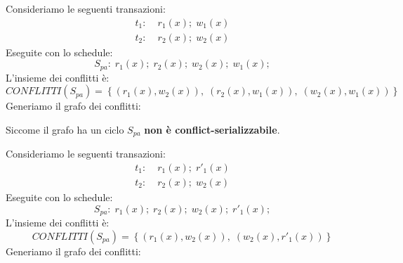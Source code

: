 \documentclass[a4paper]{article}
\begin{document}
\vspace{1em}
\noindent
\begin{example}
  Consideriamo le seguenti transazioni:
  \[
    \begin{aligned}
      t_1:\; & r_1(x); \; w_1(x) \\
      t_2:\; & r_2(x); \; w_2(x)
    \end{aligned}
  \] 
  Eseguite con lo schedule:
  \[
    S_{pa}:\; r_1(x); \; r_2(x); \; w_2(x); \; w_1(x);
  \] 
  L'insieme dei conflitti è:
  \[
    CONFLITTI(S_{pa}) = \left\{ (r_1(x), w_2(x)),\; (r_2(x), w_1(x)),\; (w_2(x), w_1(x)) \right\}
  \] 
  Generiamo il grafo dei conflitti:
  \begin{figure}[H]
    \centering
  \end{figure}
  \noindent
  Siccome il grafo ha un ciclo \( S_{pa} \) \textbf{non è conflict-serializzabile}.
\end{example}

\begin{example}
  Consideriamo le seguenti transazioni:
  \[
    \begin{aligned}
      t_1:\; & r_1(x); \; r'_1(x) \\
      t_2:\; & r_2(x); \; w_2(x)
    \end{aligned}
  \] 
  Eseguite con lo schedule:
  \[
    S_{pa}:\; r_1(x); \; r_2(x); \; w_2(x); \; r'_1(x);
  \] 
  L'insieme dei conflitti è:
  \[
    CONFLITTI(S_{pa}) = \left\{ (r_1(x), w_2(x)),\; (w_2(x), r'_1(x)) \right\}
  \] 
  Generiamo il grafo dei conflitti:
  \begin{figure}[H]
    \centering
  \end{figure}
\end{example}
\end{document}

